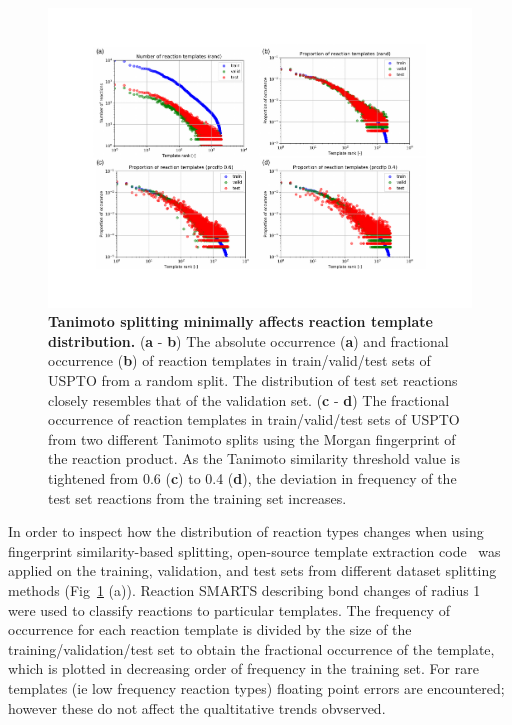 \begin{figure}[ht!]
    \centering
    \includegraphics[width=\textwidth]{Chapters/Transformer/Figs/rxn_distribution.pdf}
    \caption{\label{fig:rxn_dist} \textbf{Tanimoto splitting minimally affects reaction template distribution.} (\textbf{a} - \textbf{b}) The absolute occurrence (\textbf{a}) and fractional occurrence (\textbf{b}) of reaction templates in train/valid/test sets of USPTO from a random split. The distribution of test set reactions closely resembles that of the validation set. (\textbf{c} - \textbf{d}) The fractional occurrence of reaction templates in train/valid/test sets of USPTO from two different Tanimoto splits using the Morgan fingerprint of the reaction product. As the Tanimoto similarity threshold value is tightened from 0.6 (\textbf{c}) to 0.4 (\textbf{d}), the deviation in frequency of the test set reactions from the training set increases.}
\end{figure}

In order to inspect how the distribution of reaction types changes when using fingerprint similarity-based splitting, open-source template extraction code~\cite{Coley19WLDN5} was applied on the training, validation, and test sets from different dataset splitting methods (Fig~\ref{fig:rxn_dist} (a)). Reaction SMARTS describing bond changes of radius 1 were used to classify reactions to particular templates. The frequency of occurrence for each reaction template is divided by the size of the training/validation/test set to obtain the fractional occurrence of the template, which is plotted in decreasing order of frequency in the training set. For rare templates (ie low frequency reaction types) floating point errors are encountered; however these do not affect the qualtitative trends obvserved.

